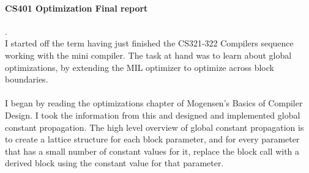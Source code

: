\documentclass[14pt]{article}
\author{Joel Anna<annajoel@pdx.edu>}
\begin{document}
\paragraph{CS401 Optimization Final report} 
.\\
I started off the term having just finished the CS321-322 Compilers sequence working with the mini compiler. The task at hand was to learn about global optimizations, by extending the MIL optimizer to optimize across block boundaries.
\paragraph{}
I began by reading the optimizations chapter of Mogensen's Basics of Compiler Design. I took the information from this and designed and implemented global constant propagation. The high level overview of global constant propagation is to create a lattice structure for each block parameter, and for every parameter that has a small number of constant values for it, replace the block call with a derived block using the constant value for that parameter.\\
\end{document}
